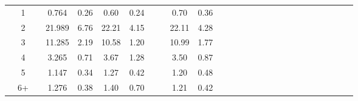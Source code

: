 \documentclass[a4paper 12pt]{article}
\numberwithin{equation}{section}
\begin{document}
\begin{tiny}
\begin{table}[h!]
\begin{tabular}{ccccccccccccccccccccccccccc}
\raisebox{1.5ex}{\bf saithe 2017 Q3} & 1  & & 0.764  & 0.26 & 0.60  & 0.24  & & & 0.70 & 0.36  \\[1ex]
& 2 &  & 21.989 & 6.76  &  22.21 & 4.15 & & & 22.11& 4.28  \\[1ex]
& 3 &  & 11.285 & 2.19  &  10.58 & 1.20 & & & 10.99& 1.77  \\[1ex]
& 4 &  & 3.265  & 0.71  &  3.67  & 1.28 & & & 3.50 & 0.87  \\[1ex]
& 5 &  & 1.147  & 0.34  &  1.27  & 0.42 & & & 1.20 & 0.48  \\[1ex]
& 6+ &   & 1.276 & 0.38  &  1.40  & 0.70 & & & 1.21 & 0.42 \\[0.5ex]

\hline
\end{tabular}
\end{table}
\end{tiny}




\clearpage



\end{document}
